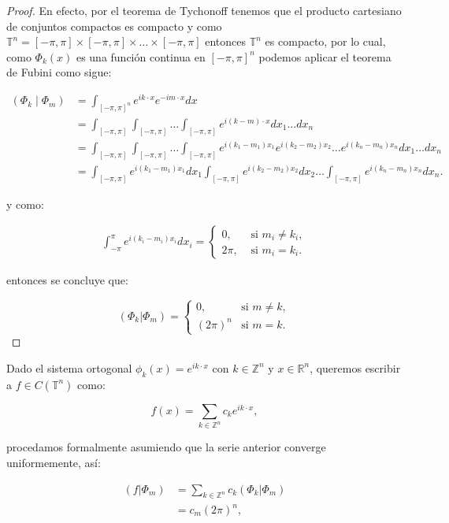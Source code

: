 \documentclass[12pt]{article}
\newcommand\R{\ensuremath{\mathbb{R}}}
\newcommand\Z{\ensuremath{\mathbb{Z}}}
\newcommand\T{\mathbb{T}}
\begin{document}
\begin{proof}
En efecto, por el teorema de Tychonoff tenemos que el producto cartesiano de conjuntos compactos es compacto y como $\T^{n}=[-\pi,\pi]\times [-\pi,\pi]\times\ldots\times[-\pi,\pi]$ entonces $\T^{n}$ es compacto, por lo cual, como $\Phi_k(x)$ es una función continua en $[-\pi,\pi]^n$ podemos aplicar el teorema de Fubini como sigue:

\begin{align*}
    \left(\Phi_k \mid \Phi_m\right)&=\int_{[-\pi,\pi]^n}e^{ik \cdot x}e^{-im\cdot x}dx\\
    &=\int_{[-\pi,\pi]}\int_{[-\pi,\pi]}\ldots \int_{[-\pi,\pi]}e^{i(k-m) \cdot x}dx_1\ldots dx_n\\
    &=\int_{[-\pi,\pi]}\int_{[-\pi,\pi]}\ldots \int_{[-\pi,\pi]}e^{i(k_1-m_1) x_1}e^{i(k_2-m_2) x_2}\ldots e^{i(k_n-m_n) x_n}dx_1\ldots dx_n\\
    &=\int_{[-\pi,\pi]}e^{i(k_1-m_1) x_1}dx_1\int_{[-\pi,\pi]}e^{i(k_2-m_2) x_2}dx_2\ldots \int_{[-\pi,\pi]} e^{i(k_n-m_n) x_n}dx_n
.\end{align*}

y como:

$$
\begin{aligned}
\int_{-\pi}^\pi e^{i(k_i-m_i)x_i} d x_i= \begin{cases}0, & \text { si } m_i \neq k_i, \\
2 \pi, & \text { si } m_i=k_i.\end{cases}
\end{aligned}
$$

entonces se concluye que:

$$(\Phi_k|\Phi_m)=\begin{cases}
0, \quad &\text{si } m\neq k,\\
(2\pi)^n &\text{si } m=k.
\end{cases}$$

\end{proof}

Dado el sistema ortogonal $\phi_k(x)=e^{ik\cdot x}$ con $k\in \Z^n$  y $x\in \R^n$, queremos escribir a $f\in C(\mathbb{T}^n)$ como:

$$f(x)=\sum_{k\in \Z^n}c_ke^{ik\cdot x},$$

procedamos formalmente asumiendo que la serie anterior converge uniformemente, así:

\begin{align*}
    \left(f|\Phi_m\right)&=\sum_{k\in \Z^n} c_k\left(\Phi_k|\Phi_m\right)\\
    &=c_m (2\pi)^n
,\end{align*}
\end{document}

